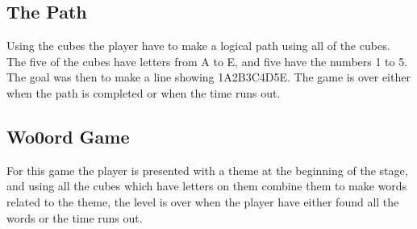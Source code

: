 \subsection{The Path}
\label{game:the_path}
Using the cubes the player have to make a logical path using all of the cubes. The five of the cubes have letters from A to E, and five have the numbers 1 to 5. The goal was then to make a line showing 1A2B3C4D5E. The game is over either when the path is completed or when the time runs out.

\subsection{Wo0ord Game}
\label{game:wo0ord_game}
For this game the player is presented with a theme at the beginning of the stage, and using all the cubes which have letters on them combine them to make words related to the theme, the level is over when the player have either found all the words or the time runs out.